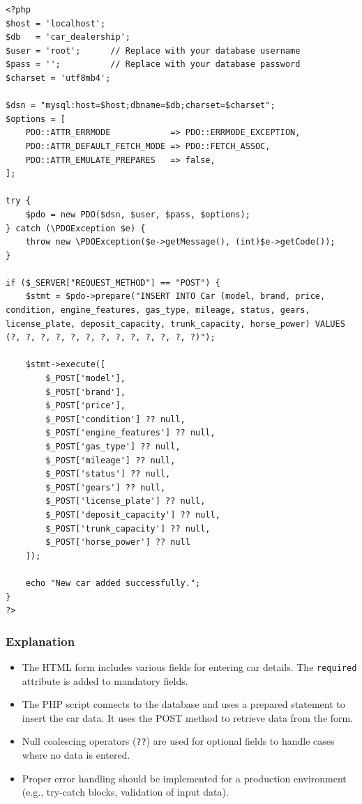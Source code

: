 \documentclass[11pt]{article}
\begin{document}
\begin{verbatim}
<?php
$host = 'localhost';
$db   = 'car_dealership';
$user = 'root';      // Replace with your database username
$pass = '';          // Replace with your database password
$charset = 'utf8mb4';

$dsn = "mysql:host=$host;dbname=$db;charset=$charset";
$options = [
    PDO::ATTR_ERRMODE            => PDO::ERRMODE_EXCEPTION,
    PDO::ATTR_DEFAULT_FETCH_MODE => PDO::FETCH_ASSOC,
    PDO::ATTR_EMULATE_PREPARES   => false,
];

try {
    $pdo = new PDO($dsn, $user, $pass, $options);
} catch (\PDOException $e) {
    throw new \PDOException($e->getMessage(), (int)$e->getCode());
}

if ($_SERVER["REQUEST_METHOD"] == "POST") {
    $stmt = $pdo->prepare("INSERT INTO Car (model, brand, price, condition, engine_features, gas_type, mileage, status, gears, license_plate, deposit_capacity, trunk_capacity, horse_power) VALUES (?, ?, ?, ?, ?, ?, ?, ?, ?, ?, ?, ?, ?)");

    $stmt->execute([
        $_POST['model'],
        $_POST['brand'],
        $_POST['price'],
        $_POST['condition'] ?? null,
        $_POST['engine_features'] ?? null,
        $_POST['gas_type'] ?? null,
        $_POST['mileage'] ?? null,
        $_POST['status'] ?? null,
        $_POST['gears'] ?? null,
        $_POST['license_plate'] ?? null,
        $_POST['deposit_capacity'] ?? null,
        $_POST['trunk_capacity'] ?? null,
        $_POST['horse_power'] ?? null
    ]);

    echo "New car added successfully.";
}
?>
\end{verbatim}

\subsubsection{Explanation}
\label{sec:org02c408b}
\begin{itemize}
\item The HTML form includes various fields for entering car details. The
\texttt{required} attribute is added to mandatory fields.
\item The PHP script connects to the database and uses a prepared statement
to insert the car data. It uses the POST method to retrieve data from
the form.
\item Null coalescing operators (\texttt{??}) are used for optional fields to
handle cases where no data is entered.
\item Proper error handling should be implemented for a production
environment (e.g., try-catch blocks, validation of input data).
\end{itemize}
\end{document}
